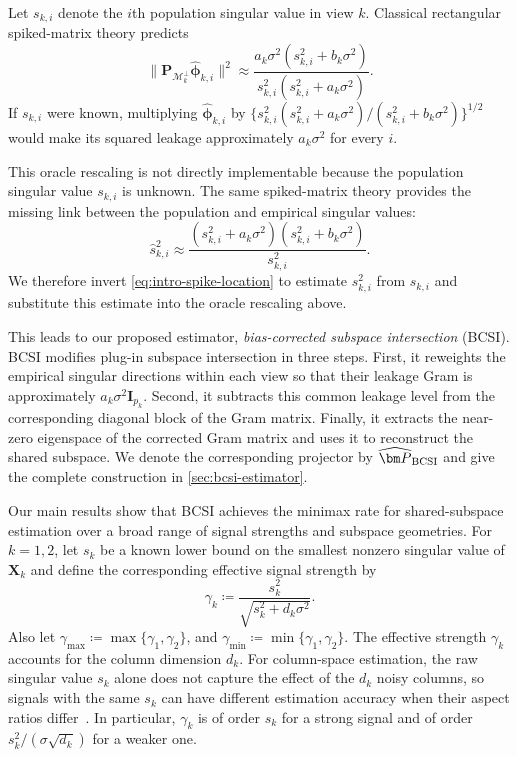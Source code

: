 \documentclass[11pt]{article}
\newcommand{\cM}{\mathcal{M}}
\newcommand{\gmin}{\gamma_{\min}}
\newcommand{\gmax}{\gamma_{\max}}
\begin{document}
Let $s_{k,i}$ denote the $i$th population singular value in view $k$.  
Classical rectangular spiked-matrix theory
\citep{benaych2012singular,gavish2017optimal} predicts
\begin{equation}
\label{eq:intro-spike-leakage}
  \bigl\|
    \bm P_{\cM_k^\perp}\widehat{\bm\phi}_{k,i}
  \bigr\|^2
  \approx
  \frac{
    a_k\sigma^2(s_{k,i}^2+b_k\sigma^2)
  }{
    s_{k,i}^2(s_{k,i}^2+a_k\sigma^2)
  }.
\end{equation}
If $s_{k,i}$ were known, multiplying $\widehat{\bm\phi}_{k,i}$ by
$\{s_{k,i}^2(s_{k,i}^2+a_k\sigma^2)/
(s_{k,i}^2+b_k\sigma^2)\}^{1/2}$ would make its squared leakage approximately
$a_k\sigma^2$ for every $i$.  

This oracle rescaling is not directly implementable because the population
singular value $s_{k,i}$ is unknown. The same spiked-matrix theory provides the
missing link between the population and empirical singular values:
\begin{equation}
\label{eq:intro-spike-location}
  \widehat s_{k,i}^2
  \approx
  \frac{
    (s_{k,i}^2+a_k\sigma^2)
    (s_{k,i}^2+b_k\sigma^2)
  }{
    s_{k,i}^2
  }.
\end{equation}
We therefore invert \cref{eq:intro-spike-location} to estimate $s_{k,i}^2$
from $\widehat s_{k,i}$ and substitute this estimate into the oracle
rescaling above.


This leads to our proposed estimator, \emph{bias-corrected subspace
intersection} (BCSI).
BCSI modifies plug-in subspace intersection in three
steps. First, it reweights the empirical singular directions within each view
so that their leakage Gram is approximately
$a_k\sigma^2\bm I_{p_k}$. Second, it subtracts this common leakage level from
the corresponding diagonal block of the Gram matrix. Finally, it extracts the near-zero eigenspace of the corrected Gram matrix
and uses it to reconstruct the shared subspace. We denote the corresponding projector by
$\widehat{\bm P}_{\rm BCSI}$ and give the complete construction in
\cref{sec:bcsi-estimator}.







Our main results show that BCSI achieves the minimax rate for shared-subspace
estimation over a broad range of signal strengths and subspace geometries.  For $k=1,2$, let $s_k$ be a known lower bound on the 
smallest nonzero singular value of $\bm X_k$ and define the corresponding effective signal strength by
\begin{equation}
\label{eq:effective-strength}
  \gamma_k
  \coloneqq
  \frac{s_k^2}{\sqrt{s_k^2+d_k\sigma^2}}.
\end{equation}
Also let $\gmax \coloneqq \max \{\gamma_1, \gamma_2\}$, and $\gmin \coloneqq \min \{\gamma_1, \gamma_2\}$.  
The effective strength $\gamma_k$ accounts for the column dimension $d_k$.
For column-space estimation, the raw singular value $s_k$ alone does not
capture the effect of the $d_k$ noisy columns, so signals with the same
$s_k$ can have different estimation accuracy when their aspect ratios differ~\citep{cai2018rate, Cai2021Unbalanced}.
In particular, $\gamma_k$ is of order $s_k$ for a strong signal and
of order $s_k^2/(\sigma\sqrt{d_k})$ for a weaker one.
\end{document}
